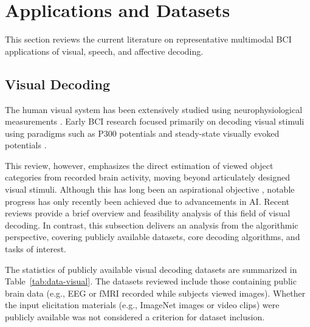 \documentclass[journal]{IEEEtran}
\begin{document}
\section{Applications and Datasets} \label{sect:applications}

This section reviews the current literature on representative multimodal BCI applications of visual, speech, and affective decoding.

\subsection{Visual Decoding} \label{sect:vision}

The human visual system has been extensively studied using neurophysiological measurements \cite{Thorpe1996, Kamitani2005}. Early BCI research focused primarily on decoding visual stimuli using paradigms such as P300 potentials \cite{Sutton1965} and steady-state visually evoked potentials \cite{Friman2007}.

This review, however, emphasizes the direct estimation of viewed object categories from recorded brain activity, moving beyond articulately designed visual stimuli. Although this has long been an aspirational objective \cite{Haxby2001}, notable progress has only recently been achieved due to advancements in AI. Recent reviews \cite{Zhang2022, Wilson2024} provide a brief overview and feasibility analysis of this field of visual decoding. In contrast, this subsection delivers an analysis from the algorithmic perspective, covering publicly available datasets, core decoding algorithms, and tasks of interest.

The statistics of publicly available visual decoding datasets are summarized in Table~\ref{tab:data-visual}. The datasets reviewed include those containing public brain data (e.g., EEG or fMRI recorded while subjects viewed images). Whether the input elicitation materials (e.g., ImageNet images or video clips) were publicly available was not considered a criterion for dataset inclusion.
\end{document}
